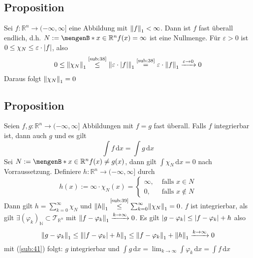 \subsection[\protect{Proposition: $f$ mit $\norm[1]{f}< \infty $ ist fast überall endlich}]{Proposition} %
\label{sub:58}
Sei $f : \mathds{R}^n \to (-\infty, \infty]$ eine Abbildung mit $\norm[1]{f}< \infty $. Dann ist $f$ fast überall endlich, d.h. $N:= \set[x \in \mathds{R}^n]{f(x)=\infty} $
ist eine Nullmenge.
Für $\varepsilon >0 $ ist $0\le \chi_N\le \varepsilon \cdot \lvert f\rvert $, also
\begin{align*}
	0 \le \norm[1]{\chi_N} \stackrel{\text{\ref{sub:38}}}{\le} \norm[1]{\varepsilon \cdot \abs{f} } \stackrel{\text{\ref{sub:38}}}{=} \varepsilon \cdot \norm[1]{f}
	\xrightarrow{\varepsilon \to 0} 0   
\end{align*}
Daraus folgt $\norm[1]{\chi_N} =0 $ \bewende

\subsection[Proposition: Die Integrale fast gleicher Funktionen stimmen überein]{Proposition} %
\label{sub:59}
Seien $f,g : \mathds{R}^n \to (-\infty, \infty]$ Abbildungen mit $f=g$ fast überall. Falls $f$ integrierbar ist, dann auch $g$ und es gilt 
\[
	\int\! f  \, \mathrm{d}x  = \int\! g  \, \mathrm{d}x 
\]
Sei $N := \set[x \in \mathds{R}^n]{f(x)\not= g(x)} $, dann gilt $\int\! \chi_N  \, \mathrm{d}x =0$ nach Vorraussetzung. Definiere $h : \mathds{R}^n \to (-\infty, \infty]$
durch 
\[
	h(x) := \infty \cdot \chi_N(x) = \begin{cases}
		\infty, &\text{ falls }x \in N\\
		0 , &\text{ falls } x \not\in N
	\end{cases}
\]
Dann gilt $h = \sum_{k=0}^{\infty} \chi_N$ und $\norm[1]{h} \stackrel{\text{\ref{sub:39}}}{\le} \sum_{k=0}^{\infty} \norm[1]{\chi_N} = 0  $. $f$ ist integrierbar, als gilt
$\exists (\varphi_k)_\mathds{N} \subset \mathcal{T}_{\mathds{R}^n}$ mit $\norm[1]{f- \varphi_k} \xrightarrow{k \to \infty} 0 $. Es gilt 
$\lvert g - \varphi_k\rvert \le   \lvert f- \varphi_k\rvert +h$ also 
\[
	\norm[1]{g- \varphi_k} \le \norm[1]{\abs{f- \varphi_k} +h } \le \norm[1]{f- \varphi_k} + \norm[1]{h} \xrightarrow{k \to \infty} 0    
\]
mit (\ref{sub:41}) folgt: $g$ integrierbar und $\int\! g  \, \mathrm{d}x  = \lim_{ k \to \infty} \int\! \varphi_k  \, \mathrm{d}x = \int\! f  \, \mathrm{d}x $ \bewende

